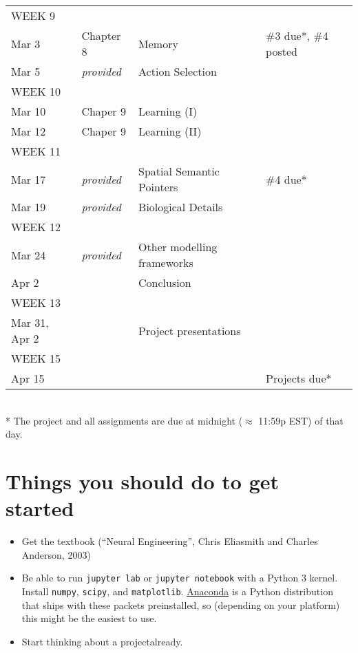 \documentclass[10pt,letterpaper,oneside]{article}
\begin{document}
\begin{center}
\begin{tabular}{p{2.5cm} p{2.5cm} p{6cm} p{3.75cm}}
	\footnotesize WEEK 9 & & & \\
	Mar 3 &
	Chapter 8 &
	Memory &
	\#3 due*, \#4 posted\\
	Mar 5 &
	\emph{provided} &
	Action Selection &
	\\[0.125cm]

	\footnotesize WEEK 10 & & & \\
	Mar 10 &
	Chaper 9 &
	Learning (I) &
	\\
	Mar 12 &
	Chaper 9 &
	Learning (II) &
	\\[0.125cm]

	\footnotesize WEEK 11 & & & \\
	Mar 17 &
	\emph{provided} &
	Spatial Semantic Pointers &
	\#4 due*\\
	Mar 19 &
	\emph{provided} &
	Biological Details &
	\\[0.125cm]

	\footnotesize WEEK 12 & & & \\
	Mar 24 &
	\emph{provided} &
	Other modelling frameworks &
	\\
	Apr 2 &
	&
	Conclusion &
	\\[0.125cm]

	\footnotesize WEEK 13 & & & \\
	Mar 31, Apr 2 &
	&
	Project presentations &
	\\[0.125cm]

	\footnotesize WEEK 15 & & & \\
	Apr 15 &
	&
	&
	Projects due* \\
	\bottomrule
\end{tabular}\\[0.2cm]
\footnotesize
* The project and all assignments are due at midnight ($\approx$ 11:59p EST) of that day.
\end{center}

\newpage

\section{Things you should do to get started}

\begin{itemize}
	\item Get the textbook (\enquote{Neural Engineering}, Chris Eliasmith and Charles Anderson, 2003)
	\item Be able to run \texttt{jupyter lab} or \texttt{jupyter notebook} with a Python 3 kernel. Install \texttt{numpy}, \texttt{scipy}, and \texttt{matplotlib}. \href{https://www.anaconda.com/distribution/}{Anaconda} is a Python distribution that ships with these packets preinstalled, so (depending on your platform) this might be the easiest to use.
	\item Start thinking about a project\textellipsis already.
\end{itemize}

\newpage
\printbibliography
\end{document}
